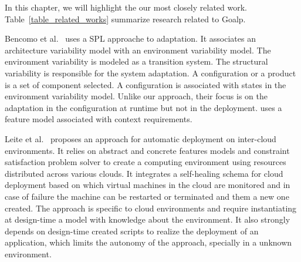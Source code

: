 
In this chapter, we will highlight the our most closely related work. Table~\ref{table_related_works} summarize research related to Goalp.





Bencomo et al.~\cite{bencomo_dynamically_2008} uses a SPL approache to adaptation. It  associates an architecture variability model with an environment variability model. The environment variability is modeled as a transition system. The structural variability is responsible for the system adaptation. A configuration or a product is a set of component selected. A configuration is associated with states in the environment variability model. Unlike our approach, their focus is on the adaptation in the configuration at runtime but not in the deployment. \citep{mizouni_framework_2014} uses a feature model associated with context requirements.

Leite et al.~\cite{ferreira_leite_user_2014} proposes an approach for automatic deployment on inter-cloud environments. It relies on abstract and concrete features models and constraint satisfaction problem solver to create a computing environment using resources distributed across various clouds.
It integrates a self-healing schema for cloud deployment based on which virtual machines in the cloud are monitored and in case of failure the machine can be
restarted or terminated and them a new one created.
The approach is specific to cloud environments and require instantiating at design-time a model with knowledge about the environment.
It also strongly depends on design-time created scripts to realize the deployment of an application, which limits the autonomy of the approach, specially in a unknown environment.

